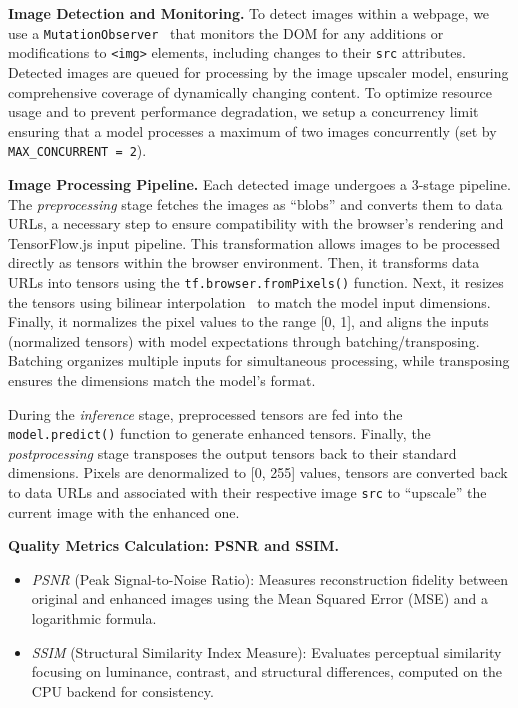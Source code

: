 \documentclass[acmsmall]{acmart}
\begin{document}
\vspace{0.05in}
\noindent
\textbf{Image Detection and Monitoring.} To detect images within a webpage, we use a \texttt{MutationObserver}~\cite{dom} that monitors the DOM for any additions or modifications to \texttt{<img>} elements, including changes to their \texttt{src} attributes. Detected images are queued for processing by the image upscaler model, ensuring comprehensive coverage of dynamically changing content. 
To optimize resource usage and to prevent performance degradation, we setup a concurrency limit ensuring that a model processes a maximum of two images concurrently (set by \texttt{MAX\_CONCURRENT = 2}). 
    
\vspace{0.05in}
\noindent
\textbf{Image Processing Pipeline.} Each detected image undergoes a 3-stage pipeline. The \textit{preprocessing} stage fetches the images as ``blobs'' and converts them to data URLs, a necessary step to ensure compatibility with the browser's rendering and TensorFlow.js input pipeline. This transformation allows images to be processed directly as tensors within the browser environment. Then, it transforms data URLs into tensors using the \texttt{tf.browser.fromPixels()} function. Next, it resizes the tensors using bilinear interpolation~\cite{gonzalez2018digital} to match the model input dimensions. Finally, it normalizes the pixel values to the range [0, 1], and aligns the inputs (normalized tensors) with model expectations through batching/transposing. Batching organizes multiple inputs for simultaneous processing, while transposing ensures the dimensions match the model's format.

During the \textit{inference} stage, preprocessed tensors are fed into the  \texttt{model.predict()} function to generate enhanced tensors. Finally, the \textit{postprocessing} stage transposes the output tensors back to their standard dimensions. Pixels are denormalized to [0, 255] values, tensors are converted back to data URLs and associated with their respective image \texttt{src} to ``upscale'' the current image with the enhanced one. 

\vspace{0.05in}
\noindent
\textbf{Quality Metrics Calculation: PSNR and SSIM.}
\begin{itemize}
    \item \textit{PSNR} (Peak Signal-to-Noise Ratio): Measures reconstruction fidelity between original and enhanced images using the Mean Squared Error (MSE) and a logarithmic formula.
    
    \item \textit{SSIM} (Structural Similarity Index Measure): Evaluates perceptual similarity focusing on luminance, contrast, and structural differences, computed on the CPU backend for consistency.
\end{itemize}
\end{document}
